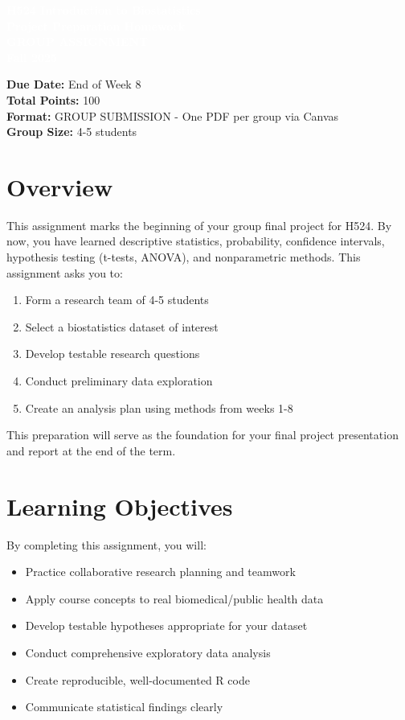 \documentclass[11pt]{article}
\title{}
\author{}
\date{}
\begin{document}
\begin{tcolorbox}[colback=osaorange,colframe=black,boxrule=2pt,arc=0pt,left=3pt,right=3pt,top=6pt,bottom=6pt,boxsep=2pt]
\centering
\textcolor{white}{\textbf{\Large H524 Introduction to Biostatistics}}\\
\textcolor{white}{\textbf{\Large Project Preparation Homework}}\\
\textcolor{white}{\textbf{\Large GROUP ASSIGNMENT}}\\
\textcolor{white}{\textbf{\Large Fall 2025}}
\end{tcolorbox}

\vspace{8pt}

\noindent\textbf{Due Date:} End of Week 8\\
\textbf{Total Points:} 100\\
\textbf{Format:} GROUP SUBMISSION - One PDF per group via Canvas\\
\textbf{Group Size:} 4-5 students

\section*{Overview}

This assignment marks the beginning of your group final project for H524. By now, you have learned descriptive statistics, probability, confidence intervals, hypothesis testing (t-tests, ANOVA), and nonparametric methods. This assignment asks you to:

\begin{enumerate}
\item Form a research team of 4-5 students
\item Select a biostatistics dataset of interest
\item Develop testable research questions
\item Conduct preliminary data exploration
\item Create an analysis plan using methods from weeks 1-8
\end{enumerate}

This preparation will serve as the foundation for your final project presentation and report at the end of the term.

\section*{Learning Objectives}

By completing this assignment, you will:
\begin{itemize}
\item Practice collaborative research planning and teamwork
\item Apply course concepts to real biomedical/public health data
\item Develop testable hypotheses appropriate for your dataset
\item Conduct comprehensive exploratory data analysis
\item Create reproducible, well-documented R code
\item Communicate statistical findings clearly
\end{itemize}
\end{document}
